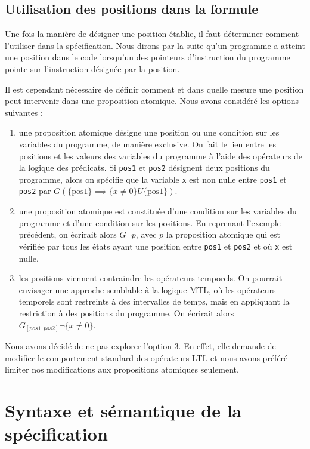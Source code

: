 \subsection{Utilisation des positions dans la formule}

Une fois la manière de désigner une position établie, il faut déterminer comment
l'utiliser dans la spécification. Nous dirons par la suite qu'un programme a
atteint une position dans le code lorsqu’un des pointeurs d'instruction du
programme pointe sur l'instruction désignée par la position.

Il est cependant nécessaire de définir comment et dans quelle mesure une
position peut intervenir dans une proposition atomique. Nous avons
considéré les options suivantes :

\begin{enumerate}
\def\labelenumi{\arabic{enumi})}
\item
  une proposition atomique désigne une position ou une condition sur les
  variables du programme, de manière exclusive. On fait le lien entre les
  positions et les valeurs des variables du programme à l'aide des opérateurs de
  la logique des prédicats. Si \texttt{pos1} et \texttt{pos2} désignent
  deux positions du programme, alors on spécifie que la variable \texttt{x}
  est non nulle entre \texttt{pos1} et \texttt{pos2} par \(G
  (\{\text{pos1}\}\implies \{x \neq 0\} U \{\text{pos1}\})\).
\item
  une proposition atomique est constituée d'une condition sur les variables du
  programme et d'une condition sur les positions. En reprenant l'exemple
  précédent, on écrirait alors \(G \lnot p\), avec \(p\) la proposition atomique
  qui est vérifiée par tous les états ayant une position entre \texttt{pos1}
  et \texttt{pos2} et où \texttt{x} est nulle.
\item
  les positions viennent contraindre les opérateurs temporels. On pourrait
  envisager une approche semblable à la logique MTL\cite{mtl_definition}, où les
  opérateurs temporels sont restreints à des intervalles de temps, mais en
  appliquant la restriction à des positions du programme. On écrirait alors
  \(G_{[pos1, pos2]} \lnot \{ x \neq 0 \}\).
\end{enumerate}

Nous avons décidé de ne pas explorer l'option 3. En effet, elle demande de
modifier le comportement standard des opérateurs LTL et nous avons préféré
limiter nos modifications aux propositions atomiques seulement.

\section{Syntaxe et sémantique de la spécification}

